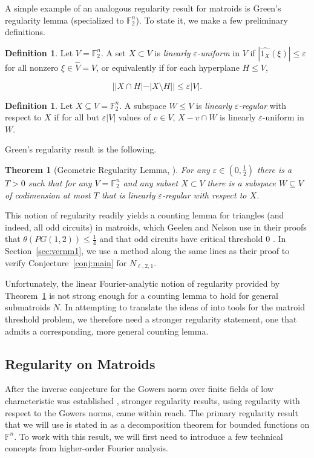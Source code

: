 \documentclass{article}
\theoremstyle{plain}
\newtheorem{thm}[theorem]{Theorem}
\theoremstyle{definition}
\theoremstyle{definition}
\newtheorem{defn}[theorem]{Definition}
\theoremstyle{remark}
\numberwithin{equation}{section}
\newcommand{\FF}{\mathbb{F}}
\begin{document}
A simple example of an analogous regularity result for matroids is Green's regularity lemma (specialized to $\FF_2^n$). To state it, we make a few preliminary definitions.

\begin{defn}
Let $V=\FF_2^n$. A set $X\subset V$ is \emph{linearly $\varepsilon$-uniform} in $V$ if $|\widehat{1_X}(\xi)|\leq \varepsilon$ for all nonzero $\xi\in \hat{V}=V$, or equivalently if for each hyperplane $H\leq V$,

\[||X\cap H|-|X\setminus H||\leq \varepsilon |V|.\]
\end{defn}

\begin{defn}
Let $X\subseteq V=\FF_2^n$. A subspace $W\leq V$ is \emph{linearly $\varepsilon$-regular} with respect to $X$ if for all but $\varepsilon |V|$ values of $v\in V$, $X-v\cap W$ is linearly $\varepsilon$-uniform in $W$.
\end{defn}

Green's regularity result is the following.

\begin{thm}[Geometric Regularity Lemma, {\cite[Thm~2.1]{gReg}}]
\label{thm:greenReg}
For any $\varepsilon\in(0,\frac{1}{2})$ there is a $T>0$ such that for any $V=\FF_2^n$ and any subset $X\subset V$ there is a subspace $W\subseteq V$ of codimension at most $T$ that is linearly $\varepsilon$-regular with respect to $X$.

\end{thm}

This notion of regularity readily yields a counting lemma for triangles (and indeed, all odd circuits) in matroids, which Geelen and Nelson use in their proofs that $\theta(PG(1,2))\leq \frac{1}{4}$ \cite{main} and that odd circuits have critical threshold $0$ \cite{geelenOdd}. In Section~\ref{sec:vernm1}, we use a method along the same lines as their proof to verify Conjecture~\ref{conj:main} for $N_{\ell,2,1}$.

Unfortunately, the linear Fourier-analytic notion of regularity provided by Theorem~\ref{thm:greenReg} is not strong enough for a counting lemma to hold for general submatroids $N$. In attempting to translate the ideas of \cite{chromThresh} into tools for the matroid threshold problem, we therefore need a stronger regularity statement, one that admits a corresponding, more general counting lemma.

\subsection{Regularity on Matroids} \label{sec:decomps}
After the inverse conjecture for the Gowers norm over finite fields of low characteristic was established \cite{tao2012inverse}, stronger regularity results, using regularity with respect to the Gowers norms, came within reach. The primary regularity result that we will use is stated in \cite{VeryCountingMaybe} as a decomposition theorem for bounded functions on $\FF^n$. To work with this result, we will first need to introduce a few technical concepts from higher-order Fourier analysis.
\end{document}
